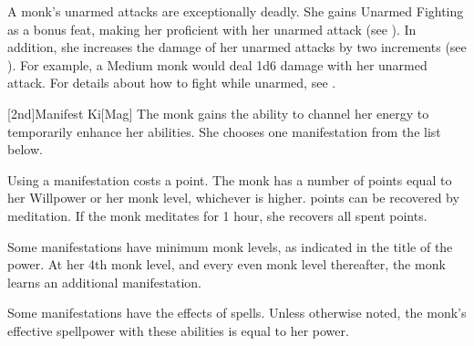         A monk's unarmed attacks are exceptionally deadly.
        She gains Unarmed Fighting as a bonus feat, making her proficient with her unarmed attack (see ).
        In addition, she increases the damage of her unarmed attacks by two increments (see ).
        For example, a Medium monk would deal 1d6 damage with her unarmed attack.
        For details about how to fight while unarmed, see .

        [2nd]{Manifest Ki}[Mag]
        The monk gains the ability to channel her \ki energy to temporarily enhance her abilities.
        She chooses one \ki manifestation from the list below.

        Using a \ki manifestation costs a \ki point.
        The monk has a number of \ki points equal to her Willpower or her monk level, whichever is higher.
        \Ki points can be recovered by meditation.
        If the monk meditates for 1 hour, she recovers all spent \ki points.

        Some \ki manifestations have minimum monk levels, as indicated in the title of the power.
        At her 4th monk level, and every even monk level thereafter, the monk learns an additional \ki manifestation.

        Some \ki manifestations have the effects of spells.
        Unless otherwise noted, the monk's effective spellpower with these abilities is equal to her \ki power.

